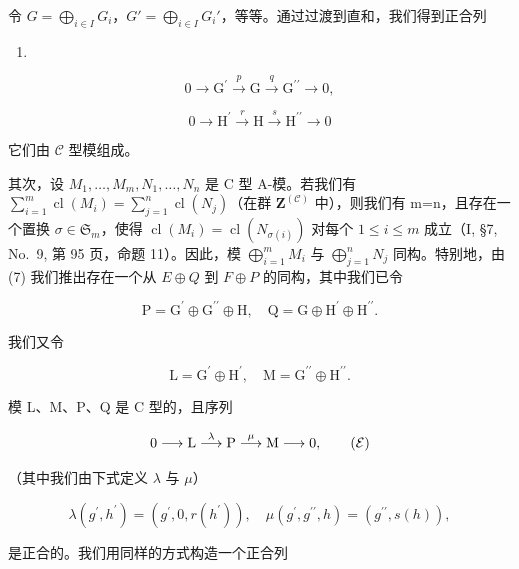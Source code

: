 令 \(G = \bigoplus_{i \in I} G_i\)，\(G' = \bigoplus_{i \in I} G_i'\)，等等。通过过渡到直和，我们得到正合列

\begin{enumerate}
\def\labelenumi{(\Alph{enumi})}
\setcounter{enumi}{6}
\tightlist
\item
\end{enumerate}

\[
0 \longrightarrow \mathrm{G} ^ {\prime} \stackrel {p} {\longrightarrow} \mathrm{G} \stackrel {q} {\longrightarrow} \mathrm{G} ^ {\prime \prime} \longrightarrow 0,\tag{H}
\]

\[
0 \longrightarrow \mathrm{H} ^ {\prime} \stackrel {r} {\longrightarrow} \mathrm{H} \stackrel {s} {\longrightarrow} \mathrm{H} ^ {\prime \prime} \longrightarrow 0
\]

它们由 \(\mathcal{C}\) 型模组成。

其次，设 \(M_{1},\ldots,M_{m},N_{1},\ldots,N_{n}\) 是 C 型 A-模。若我们有 \(\sum_{i=1}^{m}\operatorname{cl}(M_{i})=\sum_{j=1}^{n}\operatorname{cl}(N_{j})\)（在群 \(\mathbf{Z}^{(\mathcal{C})}\) 中），则我们有 m=n，且存在一个置换 \(\sigma\in\mathfrak{S}_{m}\)，使得 \(\operatorname{cl}(M_{i})=\operatorname{cl}(N_{\sigma(i)})\) 对每个 \(1\leqslant i\leqslant m\) 成立（I, §7, No.~9, 第 95 页，命题 11）。因此，模 \(\bigoplus_{i=1}^{m}M_{i}\) 与 \(\bigoplus_{j=1}^{n}N_{j}\) 同构。特别地，由 (7) 我们推出存在一个从 \(E\oplus Q\) 到 \(F\oplus P\) 的同构，其中我们已令

\[
\mathrm{P} = \mathrm{G} ^ {\prime} \oplus \mathrm{G} ^ {\prime \prime} \oplus \mathrm{H}, \quad \mathrm{Q} = \mathrm{G} \oplus \mathrm{H} ^ {\prime} \oplus \mathrm{H} ^ {\prime \prime}.
\]

我们又令

\[
\mathrm{L} = \mathrm{G} ^ {\prime} \oplus \mathrm{H} ^ {\prime}, \quad \mathrm{M} = \mathrm{G} ^ {\prime \prime} \oplus \mathrm{H} ^ {\prime \prime}.
\]

模 L、M、P、Q 是 C 型的，且序列

\[
0 \longrightarrow \mathrm{L} \stackrel {\lambda} {\longrightarrow} \mathrm{P} \stackrel {\mu} {\longrightarrow} \mathrm{M} \longrightarrow 0,\tag{\( \mathcal{E} \)}
\]

（其中我们由下式定义 \(\lambda\) 与 \(\mu\)）

\[
\lambda (g ^ {\prime}, h ^ {\prime}) = \left(g ^ {\prime}, 0, r (h ^ {\prime})\right), \quad \mu (g ^ {\prime}, g ^ {\prime \prime}, h) = \left(g ^ {\prime \prime}, s (h)\right),
\]

是正合的。我们用同样的方式构造一个正合列

